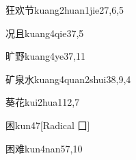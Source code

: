 \begin{entry}{狂欢节}{kuang2huan1jie2}{7,6,5}
\end{entry}

\begin{entry}{况且}{kuang4qie3}{7,5}
\end{entry}

\begin{entry}{旷野}{kuang4ye3}{7,11}
\end{entry}

\begin{entry}{矿泉水}{kuang4quan2shui3}{8,9,4}
\end{entry}

\begin{entry}{葵花}{kui2hua1}{12,7}
\end{entry}

\begin{entry}{困}{kun4}{7}[Radical ⼞]
\end{entry}

\begin{entry}{困难}{kun4nan5}{7,10}
\end{entry}


